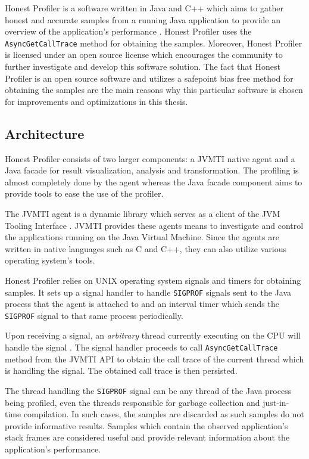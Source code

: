 \documentclass[..thesis.tex]{subfiles}
\begin{document}
Honest Profiler is a software written in Java and C++ which aims to gather honest and accurate samples from a running Java application to provide an overview of the application's performance \cite{hon_prof}. Honest Profiler uses the \texttt{Async\-Get\-Call\-Trace} method for obtaining the samples. Moreover, Honest Profiler is licensed under an open source license which encourages the community to further investigate and develop this software solution. The fact that Honest Profiler is an open source software and utilizes a safepoint bias free method for obtaining the samples are the main reasons why this particular software is chosen for improvements and optimizations in this thesis.

\subsection{Architecture}
Honest Profiler consists of two larger components: a JVMTI native agent and a Java facade for result visualization, analysis and transformation. The profiling is almost completely done by the agent whereas the Java facade component aims to provide tools to ease the use of the profiler.

The JVMTI agent is a dynamic library which serves as a client of the JVM Tooling Interface \cite{jvmtm}. JVMTI provides these agents means to investigate and control the applications running on the Java Virtual Machine. Since the agents are written in native languages such as C and C++, they can also utilize various operating system's tools.

Honest Profiler relies on UNIX operating system signals and timers for obtaining samples.
It sets up a signal handler to handle \texttt{SIGPROF} signals sent to the Java process that the agent is attached to and an interval timer which sends the \texttt{SIGPROF} signal to that same process periodically. 

Upon receiving a signal, an \textit{arbitrary} thread currently executing on the CPU will handle the signal \cite{stevens_advanced_2013}. The signal handler proceeds to call \texttt{AsyncGetCallTrace} method from the JVMTI API to obtain the call trace of the current thread which is handling the signal. The obtained call trace is then persisted.

The thread handling the \texttt{SIGPROF} signal can be any thread of the Java process being profiled, even the threads responsible for garbage collection and just-in-time compilation. In such cases, the samples are discarded as such samples do not provide informative results. Samples which contain the observed application's stack frames are considered useful and provide relevant information about the application's performance.
\end{document}
